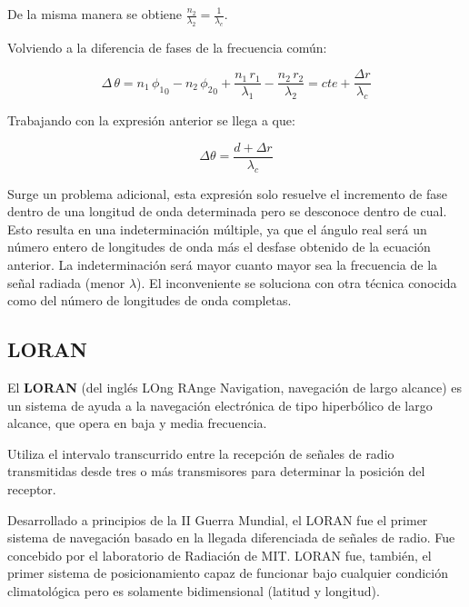 \begin{description}
De la misma manera se obtiene $\displaystyle \frac{n_2}{\lambda_2}=\frac{1}{\lambda_c}$.

Volviendo a la diferencia de fases de la frecuencia com\'un:

\[
\Delta\,\theta = n_1\,{\phi_1}_0- n_2\,{\phi_2}_0 +  \displaystyle \frac{n_1\,r_1}{\lambda_1}  - \displaystyle \frac{n_2\,r_2}{\lambda_2}= cte + \frac{\Delta r}{\lambda_c}
\]

Trabajando con la expresi\'on anterior se llega a que:

\[
\Delta \theta = \displaystyle \frac{d+\Delta r}{\lambda_c}
\]

Surge un problema adicional, esta expresi\'on solo resuelve el incremento de fase dentro de una longitud de onda determinada pero se desconoce dentro de cual. 
Esto resulta en una indeterminaci\'on m\'ultiple, ya que el \'angulo real ser\'a un n\'umero entero de longitudes de onda m\'as el desfase obtenido de la ecuaci\'on anterior. 
La indeterminaci\'on ser\'a mayor cuanto mayor sea la frecuencia de la se\~nal radiada (menor $\lambda$). 
El inconveniente se soluciona con otra t\'ecnica conocida como del n\'umero de longitudes de onda completas.


\end{description}


\subsection{LORAN}
\label{sec:06.loran}



El \textbf{LORAN} (del ingl\'es LOng RAnge Navigation, navegaci\'on de largo alcance) es un sistema de ayuda a la navegaci\'on electr\'onica de tipo hiperb\'olico
 de largo alcance, que opera en baja y media frecuencia. 

Utiliza el intervalo transcurrido entre la recepci\'on de se\~nales de radio transmitidas desde tres o m\'as transmisores para determinar la posici\'on del receptor. 

Desarrollado a principios de la II Guerra Mundial, el LORAN fue el primer sistema de navegaci\'on basado en la llegada diferenciada de se\~nales de radio. Fue concebido por el laboratorio de Radiaci\'on de MIT. LORAN fue, tambi\'en, el primer sistema de posicionamiento capaz de funcionar bajo cualquier condici\'on climatol\'ogica pero es solamente bidimensional (latitud y longitud).

